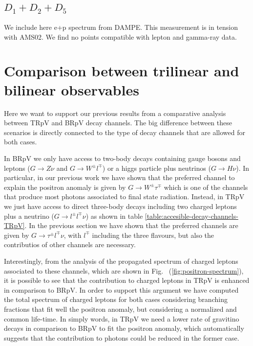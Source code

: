\documentclass[a4paper,11pt]{article}
\begin{document}
\subsection{$D_1 + D_2 + D_5$}
We include here e+p spectrum from DAMPE. This measurement is in tension with AMS02. We find no points compatible with lepton and gamma-ray data.

\section{Comparison between trilinear and bilinear observables}

Here we want to support our previous results from a comparative analysis between TRpV and BRpV decay channels. The big difference between these scenarios is directly connected to the type of decay channels that are allowed for both cases. 

In BRpV we only have access to two-body decays containing gauge bosons and leptons ($G\rightarrow Z \nu$ and $G\rightarrow W^{\pm} l^{\mp}$) or a higgs particle plus neutrinos ($G\rightarrow H\nu$). In particular, in our previous work we have shown that the preferred channel to explain the positron anomaly is given by $G\rightarrow W^{\pm} \tau^{\mp}$ which is one of the channels that produce most photons associated to final state radiation. Instead, in TRpV we just have access to direct three-body decays including two charged leptons plus a neutrino ($G\rightarrow l^{\pm} l^{\mp} \nu$) as shown in table \ref{table:accesible-decay-channels-TRpV}. In the previous section we have shown that the preferred channels are given by $G\rightarrow \tau^{\pm} l^{\mp} \nu$, with $l^{\mp}$ including the three flavours, but also the contributios of other channels are necessary.   

Interestingly, from the analysis of the propagated spectrum of charged leptons associated to these channels, which are shown in Fig.~ (\ref{fig:positron-spectrum}), it is possible to see that the contribution to charged leptons in TRpV is enhanced in comparison to BRpV. In order to support this argument we have computed the total spectrum of charged leptons for both cases considering branching fractions that fit well the positron anomaly, but considering a normalized and common life-time. In simply words, in TRpV we need a lower rate of gravitino decays in comparison to BRpV to fit the positron anomaly, which automatically suggests that the contribution to photons could be reduced in the former case.  
\end{document}
